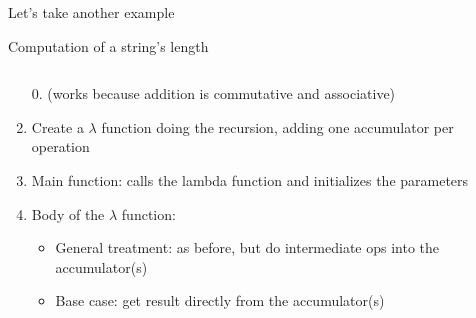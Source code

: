 \begin{frame}{Let's take another example}
  \begin{block}{Computation of a string's length}\medskip
    \begin{columns}
      \begin{column}{.48\linewidth}
      \end{column}

      \begin{column}{.48\linewidth}
      \end{column}
    \end{columns}
  \end{block}

  \begin{enumerate}
  \item[0.] (works because addition is commutative and associative)
  \item Create a $\lambda$ function doing the recursion, adding one accumulator
    per operation
  \item<2-> Main function: calls the lambda function and initializes the parameters
  \item<3-> Body of the $\lambda$ function:
    \begin{itemize}
    \item General treatment: as before, but do intermediate ops into the accumulator(s)
    \item<4-> Base case: get result directly from the accumulator(s)
    \end{itemize}
  \end{enumerate}
\end{frame}
